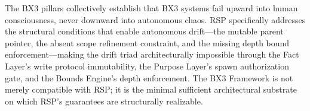 The BX3 pillars collectively establish that BX3 systems fail upward into human consciousness, never downward into autonomous chaos. RSP specifically addresses the structural conditions that enable autonomous drift---the mutable parent pointer, the absent scope refinement constraint, and the missing depth bound enforcement---making the drift triad architecturally impossible through the Fact Layer's write protocol immutability, the Purpose Layer's spawn authorization gate, and the Bounds Engine's depth enforcement. The BX3 Framework is not merely compatible with RSP; it is the minimal sufficient architectural substrate on which RSP's guarantees are structurally realizable.